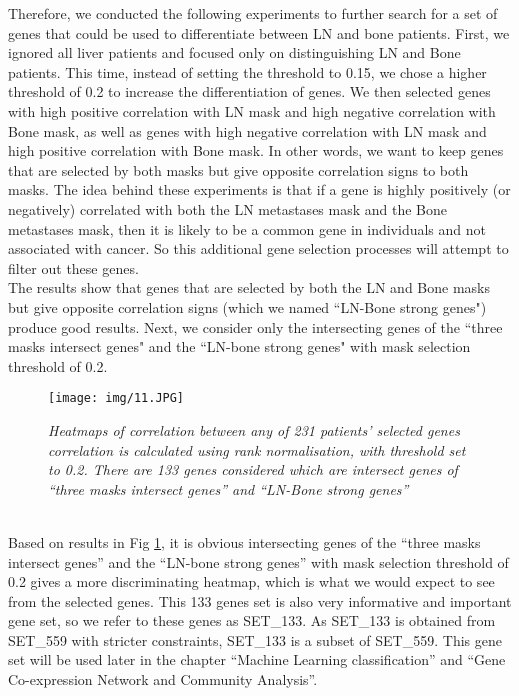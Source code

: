 \documentclass[12pt,a4paper]{report}
\begin{document}
Therefore, we conducted the following experiments to further search for a set of genes that could be used to differentiate between LN and bone patients. First, we ignored all liver patients and focused only on distinguishing LN and Bone patients. This time, instead of setting the threshold to 0.15, we chose a higher threshold of 0.2 to increase the differentiation of genes. We then selected genes with high positive correlation with LN mask and high negative correlation with Bone mask, as well as genes with high negative correlation with LN mask and high positive correlation with Bone mask. In other words, we want to keep genes that are selected by both masks but give opposite correlation signs to both masks. The idea behind these experiments is that if a gene is highly positively (or negatively) correlated with both the LN metastases mask and the Bone metastases mask, then it is likely to be a common gene in individuals and not associated with cancer. So this additional gene selection processes will attempt to filter out these genes.\\

The results show that genes that are selected by both the LN and Bone masks but give opposite correlation signs (which we named ``LN-Bone strong genes") produce good results. Next, we consider only the intersecting genes of the ``three masks intersect genes" and the ``LN-bone strong genes" with mask selection threshold of 0.2.\\


\begin{figure}[h!]
\centering
\texttt{[image: img/11.JPG]}
\caption{\textit{Heatmaps of correlation between any of 231 patients’ selected genes correlation is calculated using rank normalisation, with threshold set to 0.2. There are 133 genes considered which are intersect genes  of  “three masks intersect genes” and “LN-Bone strong genes”}}
\label{fig:133hm}
\end{figure}\\

Based on results in Fig \ref{fig:133hm}, it is obvious intersecting genes of the “three masks intersect genes” and the “LN-bone strong genes” with mask selection threshold of 0.2 gives a more discriminating heatmap, which is what we would expect to see from the selected genes. This 133 genes set is also very informative and important gene set, so we refer to these genes as SET\_133. As SET\_133 is obtained from SET\_559 with stricter constraints, SET\_133 is a subset of SET\_559. This gene set will be used later in the chapter “Machine Learning classification” and “Gene Co-expression Network and Community Analysis”.\\
\end{document}
